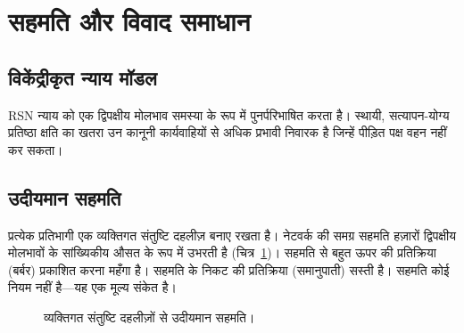 \documentclass[11pt,a4paper,twocolumn]{article}
\begin{document}
\section{सहमति और विवाद समाधान}

\subsection{विकेंद्रीकृत न्याय मॉडल}

RSN न्याय को एक द्विपक्षीय मोलभाव समस्या के रूप में पुनर्परिभाषित करता है। स्थायी, सत्यापन-योग्य प्रतिष्ठा क्षति का खतरा उन कानूनी कार्यवाहियों से अधिक प्रभावी निवारक है जिन्हें पीड़ित पक्ष वहन नहीं कर सकता।

\subsection{उदीयमान सहमति}

प्रत्येक प्रतिभागी एक व्यक्तिगत संतुष्टि दहलीज़ बनाए रखता है। नेटवर्क की समग्र सहमति हज़ारों द्विपक्षीय मोलभावों के सांख्यिकीय औसत के रूप में उभरती है (चित्र~\ref{fig:consensus})। सहमति से बहुत ऊपर की प्रतिक्रिया (बर्बर) प्रकाशित करना महँगा है। सहमति के निकट की प्रतिक्रिया (समानुपाती) सस्ती है। सहमति कोई नियम नहीं है---यह एक मूल्य संकेत है।

\begin{figure}[ht]
\centering
{}
\caption{व्यक्तिगत संतुष्टि दहलीज़ों से उदीयमान सहमति।}
\label{fig:consensus}
\end{figure}
\end{document}
